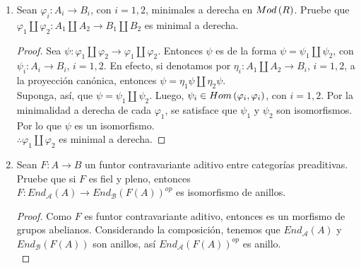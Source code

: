 \documentclass{article}
\begin{document}
\begin{enumerate}[label=\textbf{Ej \arabic*.}]
\begin{proof}
			\begin{equation*}
				\begin{split}
					pf&=g\\
					qg&=f,
				\end{split}
			\end{equation*}
			\begin{equation*}
				\begin{split}
					p'g&=h\\
					q'h&=g.
				\end{split}
			\end{equation*}
			Así $p'p\in\ringmodhom{R}{B}{C}$, $qq'\in\ringmodhom{R}{C}{B}$ y
			\begin{equation*}
				\begin{split}
					\lrprth{p'p}f&=h\\
					\lrprth{qq'}h&=f,\\			
					\therefore\ f&\sim h.
				\end{split}
			\end{equation*}
		\end{proof}
		\item Sean $\varphi_{i}:A_{i} \longrightarrow B_{i}$, con $i=1,2$, minimales a derecha en $Mod\left(R\right)$. Pruebe que $\varphi_{1}\coprod\varphi_{2}:A_{1} \coprod A_{2} \longrightarrow B_{1} \coprod B_{2}$ es minimal a derecha.
		\begin{proof}
			Sea $\psi:\varphi_{1}\coprod\varphi_{2}\longrightarrow\varphi_{1}\coprod\varphi_{2}$. Entonces $\psi$ es de la forma $\psi = \psi_{1}\coprod\psi_{2}$, con $\psi_{i}:A_{i} \longrightarrow B_{i}$, $i=1,2$. En efecto, si denotamos por $\eta_{i}:A_{1} \coprod A_{2} \longrightarrow B_{i}$, $i=1,2$, a la proyección canónica, entonces $\psi = \eta_{1}\psi\coprod\eta_{2}\psi$.\\
			
			Suponga, así, que $\psi = \psi_{1}\coprod\psi_{2}$. Luego, $\psi_{i} \in Hom\left(\varphi_{i},\varphi_{i}\right)$, con $i=1,2$. Por la minimalidad a derecha de cada $\varphi_{1}$, se satisface que $\psi_{1}$ y $\psi_{2}$ son isomorfismos. Por lo que $\psi$ es un isomorfismo.\\
			$\therefore\varphi_{1}\coprod\varphi_{2}$ es minimal a derecha.
		\end{proof}
		
		\item Sean $F\colon A\longrightarrow B$ un funtor contravariante aditivo entre categorías preaditivas. Pruebe que si $F$ es fiel y pleno, entonces\\
		$F\colon End_\mathcal{A}(A) \longrightarrow End_\mathcal{B} (F(A))^{op}$ es isomorfismo de anillos.
		\begin{proof}
			Como $F$ es funtor contravariante aditivo, entonces es un morfismo de grupos abelianos. Considerando la composición, tenemos que 
			$End_ \mathcal{A}(A)$ y $End_\mathcal{B}(F(A))$ son anillos, así $End_\mathcal{A}(F(A))^{op}$ es anillo.\\
			

\end{proof}
\end{enumerate}
\end{document}
